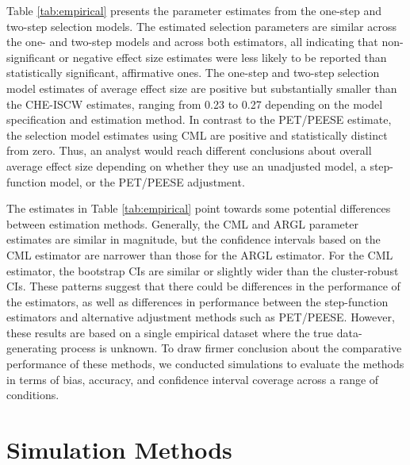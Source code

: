 \documentclass[
  american,
  man, donotrepeattitle,floatsintext]{apa7}
\begin{document}
Table \ref{tab:empirical} presents the parameter estimates from the one-step and two-step selection models.
The estimated selection parameters are similar across the one- and two-step models and across both estimators, all indicating that non-significant or negative effect size estimates were less likely to be reported than statistically significant, affirmative ones.
The one-step and two-step selection model estimates of average effect size are positive but substantially smaller than the CHE-ISCW estimates, ranging from 0.23 to 0.27 depending on the model specification and estimation method.
In contrast to the PET/PEESE estimate, the selection model estimates using CML are positive and statistically distinct from zero.
Thus, an analyst would reach different conclusions about overall average effect size depending on whether they use an unadjusted model, a step-function model, or the PET/PEESE adjustment.

The estimates in Table \ref{tab:empirical} point towards some potential differences between estimation methods.
Generally, the CML and ARGL parameter estimates are similar in magnitude, but the confidence intervals based on the CML estimator are narrower than those for the ARGL estimator.
For the CML estimator, the bootstrap CIs are similar or slightly wider than the cluster-robust CIs.
These patterns suggest that there could be differences in the performance of the estimators, as well as differences in performance between the step-function estimators and alternative adjustment methods such as PET/PEESE.
However, these results are based on a single empirical dataset where the true data-generating process is unknown.
To draw firmer conclusion about the comparative performance of these methods, we conducted simulations to evaluate the methods in terms of bias, accuracy, and confidence interval coverage across a range of conditions.

\section{Simulation Methods}\label{simulation-methods}
\end{document}
